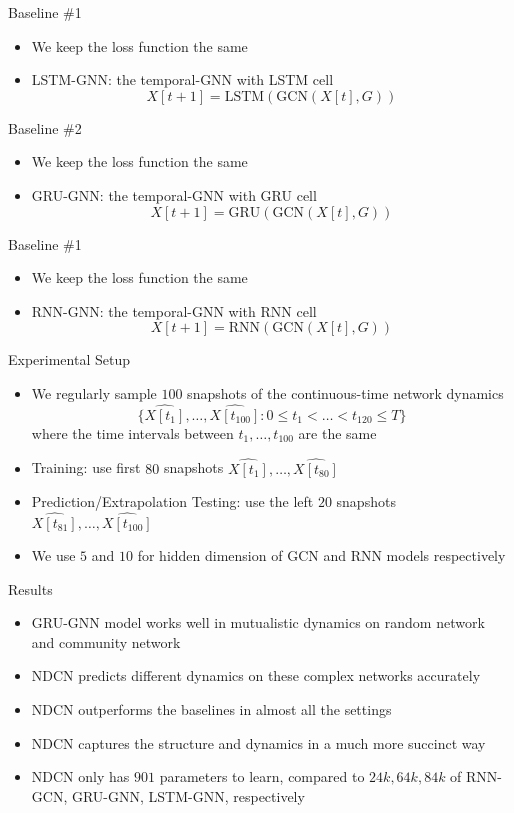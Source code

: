 \documentclass{beamer}
\begin{document}
\begin{frame}{Baseline \#1}
\begin{itemize}
\item We keep the loss function the same
\item LSTM-GNN: the temporal-GNN with LSTM cell\[
X[t+1]=\text{LSTM}(\text{GCN}(X[t],G))
\]
\end{itemize}
\end{frame}

\begin{frame}{Baseline \#2}
\begin{itemize}
\item We keep the loss function the same
\item GRU-GNN: the temporal-GNN with GRU cell\[
X[t+1]=\text{GRU}(\text{GCN}(X[t],G))
\]
\end{itemize}
\end{frame}

\begin{frame}{Baseline \#1}
\begin{itemize}
\item We keep the loss function the same
\item RNN-GNN: the temporal-GNN with RNN cell\[
X[t+1]=\text{RNN}(\text{GCN}(X[t],G))
\]
\end{itemize}
\end{frame}

\begin{frame}{Experimental Setup}
\begin{itemize}
\item We regularly sample $100$ snapshots of the continuous-time network dynamics\[
\{\hat{X[t_1]},\dots,\hat{X[t_{100}]}:0\leqslant t_1<\dots<t_{120}\leqslant T\}
\]where the time intervals between $t_1,\dots,t_{100}$ are the same
\item Training: use first $80$ snapshots $\hat{X[t_1]},\dots,\hat{X[t_{80}]}$
\item Prediction/Extrapolation Testing: use the left $20$ snapshots $\hat{X[t_{81}]},\dots,\hat{X[t_{100}]}$
\item We use $5$ and $10$ for hidden dimension of GCN and RNN models respectively
\end{itemize}
\end{frame}

\begin{frame}{Results}
\begin{itemize}
\item GRU-GNN model works well in mutualistic dynamics on random network and community network
\item NDCN predicts different dynamics on these complex networks accurately
\item NDCN outperforms the baselines in almost all the settings
\item NDCN captures the structure and dynamics in a much more succinct way
\item NDCN only has $901$ parameters to learn, compared to $24k,64k,84k$ of RNN-GCN, GRU-GNN, LSTM-GNN, respectively
\end{itemize}
\end{frame}
\end{document}
